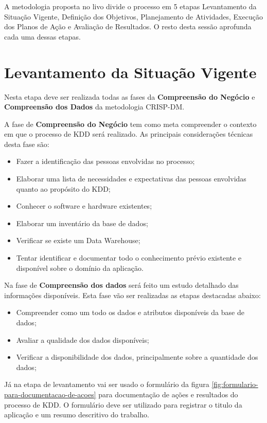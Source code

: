\documentclass[diss,capa]{texufpel}
\begin{document}
    A metodologia proposta no livo divide o processo em 5 etapas Levantamento da Situação Vigente, Definição dos Objetivos, Planejamento de Atividades, Execução dos Planos de Ação e Avaliação de Resultados. O resto desta sessão aprofunda cada uma dessas etapas.
    
    \section{Levantamento da Situação Vigente}
    \label{sec:levantamento-da-situacao-vigente}
    
    Nesta etapa deve ser realizada todas as fases da \textbf{Compreensão do Negócio} e \textbf{Compreensão dos Dados} da metodologia CRISP-DM. 
    
    A fase de \textbf{Compreensão do Negócio} tem como meta compreender o contexto em que o processo de KDD será realizado. As principais considerações técnicas desta fase são:
    \begin{itemize}
    \item Fazer a identificação das pessoas envolvidas no processo;
    \item Elaborar uma lista de necessidades e expectativas das pessoas envolvidas quanto ao propósito do KDD;
    \item Conhecer o software e hardware existentes;
    \item Elaborar um inventário da base de dados;
    \item Verificar se existe um Data Warehouse;
    \item Tentar identificar e documentar todo o conhecimento prévio existente e disponível sobre o domínio da aplicação.
    \end{itemize}
    
    Na fase de \textbf{Compreensão dos dados} será feito um estudo detalhado das informações disponíveis. Esta fase vão ser realizadas as etapas destacadas abaixo:
    \begin{itemize}
    \item Compreender como um todo os dados e atributos disponíveis da base de dados;
    \item Avaliar a qualidade dos dados disponíveis;
    \item Verificar a disponibilidade dos dados, principalmente sobre a quantidade dos dados;
    \end{itemize}
    
    Já na etapa de levantamento vai ser usado o formulário da figura \ref{fig:formulario-para-documentacao-de-acoes} para documentação de ações e resultados do processo de KDD. O formulário deve ser utilizado para registrar o titulo da aplicação e um resumo descritivo do trabalho.
    
\end{document}
